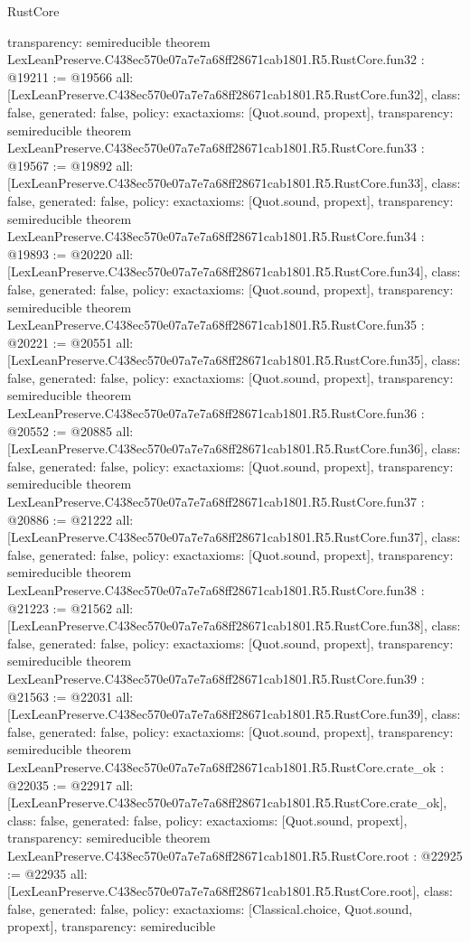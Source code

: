 \begin{lexlean}{RustCore}
\begin{coremodule}
{  transparency: semireducible
}
theorem LexLeanPreserve.C438ec570e07a7e7a68ff28671cab1801.R5.RustCore.fun32 : @19211 := @19566 {
  all: [LexLeanPreserve.C438ec570e07a7e7a68ff28671cab1801.R5.RustCore.fun32],
  class: false,
  generated: false,
  policy: exact{axioms: [Quot.sound, propext]},
  transparency: semireducible
}
theorem LexLeanPreserve.C438ec570e07a7e7a68ff28671cab1801.R5.RustCore.fun33 : @19567 := @19892 {
  all: [LexLeanPreserve.C438ec570e07a7e7a68ff28671cab1801.R5.RustCore.fun33],
  class: false,
  generated: false,
  policy: exact{axioms: [Quot.sound, propext]},
  transparency: semireducible
}
theorem LexLeanPreserve.C438ec570e07a7e7a68ff28671cab1801.R5.RustCore.fun34 : @19893 := @20220 {
  all: [LexLeanPreserve.C438ec570e07a7e7a68ff28671cab1801.R5.RustCore.fun34],
  class: false,
  generated: false,
  policy: exact{axioms: [Quot.sound, propext]},
  transparency: semireducible
}
theorem LexLeanPreserve.C438ec570e07a7e7a68ff28671cab1801.R5.RustCore.fun35 : @20221 := @20551 {
  all: [LexLeanPreserve.C438ec570e07a7e7a68ff28671cab1801.R5.RustCore.fun35],
  class: false,
  generated: false,
  policy: exact{axioms: [Quot.sound, propext]},
  transparency: semireducible
}
theorem LexLeanPreserve.C438ec570e07a7e7a68ff28671cab1801.R5.RustCore.fun36 : @20552 := @20885 {
  all: [LexLeanPreserve.C438ec570e07a7e7a68ff28671cab1801.R5.RustCore.fun36],
  class: false,
  generated: false,
  policy: exact{axioms: [Quot.sound, propext]},
  transparency: semireducible
}
theorem LexLeanPreserve.C438ec570e07a7e7a68ff28671cab1801.R5.RustCore.fun37 : @20886 := @21222 {
  all: [LexLeanPreserve.C438ec570e07a7e7a68ff28671cab1801.R5.RustCore.fun37],
  class: false,
  generated: false,
  policy: exact{axioms: [Quot.sound, propext]},
  transparency: semireducible
}
theorem LexLeanPreserve.C438ec570e07a7e7a68ff28671cab1801.R5.RustCore.fun38 : @21223 := @21562 {
  all: [LexLeanPreserve.C438ec570e07a7e7a68ff28671cab1801.R5.RustCore.fun38],
  class: false,
  generated: false,
  policy: exact{axioms: [Quot.sound, propext]},
  transparency: semireducible
}
theorem LexLeanPreserve.C438ec570e07a7e7a68ff28671cab1801.R5.RustCore.fun39 : @21563 := @22031 {
  all: [LexLeanPreserve.C438ec570e07a7e7a68ff28671cab1801.R5.RustCore.fun39],
  class: false,
  generated: false,
  policy: exact{axioms: [Quot.sound, propext]},
  transparency: semireducible
}
theorem LexLeanPreserve.C438ec570e07a7e7a68ff28671cab1801.R5.RustCore.crate_ok : @22035 := @22917 {
  all: [LexLeanPreserve.C438ec570e07a7e7a68ff28671cab1801.R5.RustCore.crate_ok],
  class: false,
  generated: false,
  policy: exact{axioms: [Quot.sound, propext]},
  transparency: semireducible
}
theorem LexLeanPreserve.C438ec570e07a7e7a68ff28671cab1801.R5.RustCore.root : @22925 := @22935 {
  all: [LexLeanPreserve.C438ec570e07a7e7a68ff28671cab1801.R5.RustCore.root],
  class: false,
  generated: false,
  policy: exact{axioms: [Classical.choice, Quot.sound, propext]},
  transparency: semireducible
}


\end{coremodule}
\end{lexlean}
